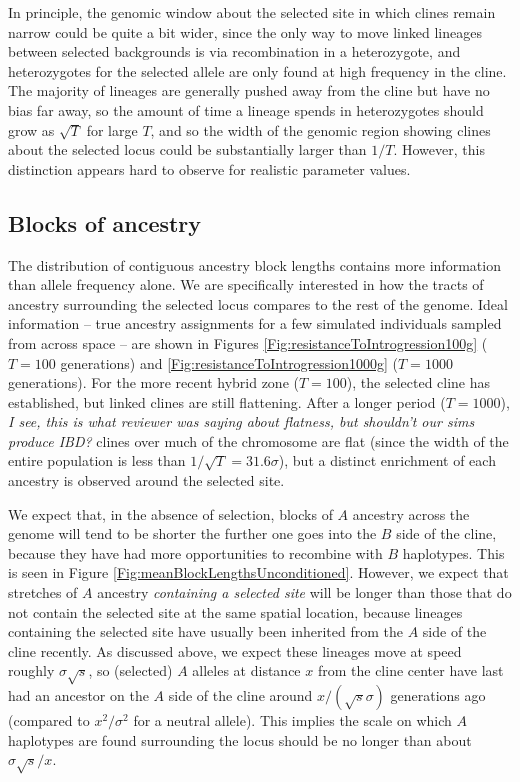 \documentclass[11pt,letterpaper]{article}
\newcommand{\alisa}[1]{{\em \color{red} #1}}
\newcommand{\plr}[1]{{\em \color{blue} #1}}
\begin{document}
In principle, the genomic window about the selected site
in which clines remain narrow could be quite a bit wider,
since the only way to move linked lineages between selected backgrounds is via recombination in a heterozygote,
and heterozygotes for the selected allele are only found at high frequency in the cline.
The majority of lineages are generally pushed away from the cline but have no bias far away,
so the amount of time a lineage spends in heterozygotes should grow as $\sqrt{T}$ for large $T$,
and so the width of the genomic region showing clines about the selected locus could be 
substantially larger than $1/T$. However, this distinction appears hard to observe for realistic parameter values.






\subsection*{Blocks of ancestry}

The distribution of contiguous ancestry block lengths contains more information than allele frequency alone. We are specifically interested in how the tracts of ancestry surrounding the selected locus compares to the rest of the genome. 
Ideal information -- true ancestry assignments for a few simulated individuals sampled from across space -- %
are shown in Figures \ref{Fig:resistanceToIntrogression100g} ($T=100$ generations) and \ref{Fig:resistanceToIntrogression1000g} ($T=1000$ generations).
For the more recent hybrid zone ($T=100$), the selected cline has established,
but linked clines are still flattening.
After a longer period ($T=1000$), \alisa{I see, this is what reviewer was saying about flatness, but shouldn't our sims produce IBD?}
clines over much of the chromosome are flat
(since the width of the entire population is less than $1/\sqrt{T}=31.6\sigma$),
but a distinct enrichment of each ancestry is observed around the selected site.

We expect that, in the absence of selection, blocks of $A$ ancestry across the genome 
will tend to be shorter the further one goes into the $B$ side of the cline,
because they have had more opportunities to recombine with $B$ haplotypes. 
This is seen in Figure \ref{Fig:meanBlockLengthsUnconditioned}.
However, we expect that stretches of $A$ ancestry \emph{containing a selected site} will be longer
than those that do not contain the selected site at the same spatial location,
because lineages containing the selected site have usually been inherited from the $A$ side of the cline recently. 
As discussed above, we expect these lineages move at speed roughly $\sigma\sqrt{s}$,
so (selected) $A$ alleles at distance $x$ from the cline center
have last had an ancestor on the $A$ side of the cline around $x/(\sqrt{s}\sigma)$ generations ago 
(compared to $x^2/\sigma^2$ for a neutral allele).
This implies the scale on which $A$ haplotypes are found surrounding the locus should be no longer than about $\sigma\sqrt{s}/x$.
\end{document}
